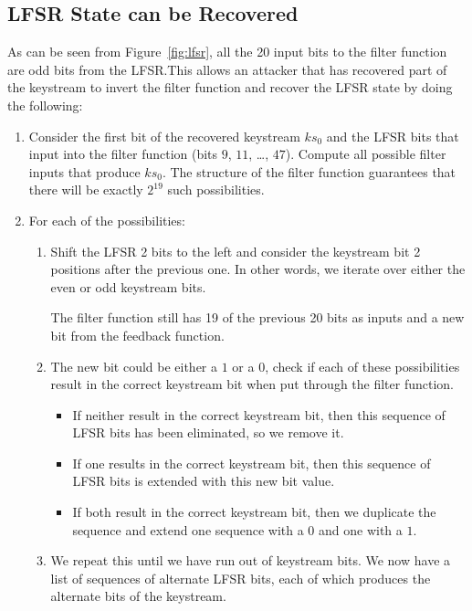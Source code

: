 \documentclass[dissertation.tex]{subfiles}
\begin{document}
  \subsection{LFSR State can be Recovered}\label{sec:lfsr_state_recovery}
  As can be seen from Figure~\vref{fig:lfsr}, all the 20 input bits to the filter function are odd bits from the LFSR.\@ This allows an attacker that has recovered part of the keystream to invert the filter function and recover the LFSR state by doing the following:

  \begin{enumerate}
    \item Consider the first bit of the recovered keystream $ks_0$ and the LFSR bits that input into the filter function (bits $9$, $11$, \ldots, $47$). Compute all possible filter inputs that produce $ks_0$. The structure of the filter function guarantees that there will be exactly $2^{19}$ such possibilities.

    \item For each of the possibilities:
      \begin{enumerate}
        \item Shift the LFSR 2 bits to the left and consider the keystream bit 2 positions after the previous one. In other words, we iterate over either the even or odd keystream bits.

        The filter function still has 19 of the previous 20 bits as inputs and a new bit from the feedback function.

        \item The new bit could be either a $1$ or a $0$, check if each of these possibilities result in the correct keystream bit when put through the filter function.
          \begin{itemize}
            \item If neither result in the correct keystream bit, then this sequence of LFSR bits has been eliminated, so we remove it.

            \item If one results in the correct keystream bit, then this sequence of LFSR bits is extended with this new bit value.

            \item If both result in the correct keystream bit, then we duplicate the sequence and extend one sequence with a $0$ and one with a $1$.
          \end{itemize}
        \item We repeat this until we have run out of keystream bits. We now have a list of sequences of alternate LFSR bits, each of which produces the alternate bits of the keystream.
      \end{enumerate}


\end{enumerate}
\end{document}
